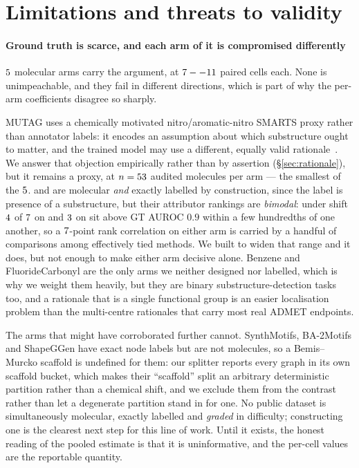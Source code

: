 \section{Limitations and threats to validity}
\label{sec:limits}

\paragraph{Ground truth is scarce, and each arm of it is compromised
differently} $5{}$ molecular arms carry the argument, at
$7--11{}$ paired cells each. None is unimpeachable, and they fail in
different directions, which is part of why the per-arm coefficients disagree so
sharply.

MUTAG uses a chemically motivated nitro/aromatic-nitro SMARTS proxy rather than
annotator labels: it encodes an assumption about which substructure ought to
matter, and the trained model may use a different, equally valid
rationale~\cite{faber}. We answer that objection empirically rather than by
assertion (\S\ref{sec:rationale}), but it remains a proxy, at
$n=53{}$ audited molecules per arm --- the smallest of the
$5{}$. \molDataset{} and \hardDataset{} are molecular \emph{and} exactly
labelled by construction, since the label is presence of a substructure, but
their attributor rankings are \emph{bimodal}: under shift
$4{}$ of $7{}$ on \molDataset{} and
$3{}$ on \hardDataset{} sit above GT AUROC $0.9$ within a
few hundredths of one another, so a $7{}$-point rank correlation
on either arm is carried by a handful of comparisons among effectively tied
methods. We built \hardDataset{} to widen that range and it does, but not
enough to make either arm decisive alone. Benzene and FluorideCarbonyl are the
only arms we neither designed nor labelled, which is why we weight them
heavily, but they are binary substructure-detection tasks too, and a rationale
that is a single functional group is an easier localisation problem than the
multi-centre rationales that carry most real ADMET endpoints.

The arms that might have corroborated further cannot. SynthMotifs, BA-2Motifs
and ShapeGGen have exact node labels but are not molecules, so a Bemis--Murcko
scaffold is undefined for them: our splitter reports every graph in its own
scaffold bucket, which makes their ``scaffold'' split an arbitrary
deterministic partition rather than a chemical shift, and we exclude them from
the contrast rather than let a degenerate partition stand in for one. No public
dataset is simultaneously molecular, exactly labelled and \emph{graded} in
difficulty; constructing one is the clearest next step for this line of work.
Until it exists, the honest reading of the pooled estimate is that it is
uninformative, and the per-cell values are the reportable quantity.

